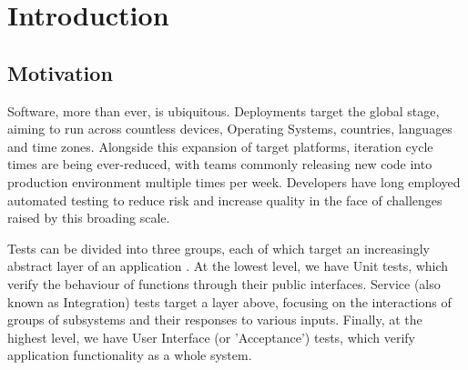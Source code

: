 \section{Introduction}
\label{sec:intro}


\subsection{Motivation}

Software, more than ever, is ubiquitous. Deployments target the global stage, aiming to run across countless devices, Operating Systems, countries, languages and time zones. Alongside this expansion of target platforms, iteration cycle times are being ever-reduced, with teams commonly releasing new code into production environment multiple times per week. Developers have long employed automated testing to reduce risk and increase quality in the face of challenges raised by this broading scale.

Tests can be divided into three groups, each of which target an increasingly abstract layer of an application \citep[see][Chapter~16]{cohn2009succeeding}. At the lowest level, we have Unit tests, which verify the behaviour of functions through their public interfaces. Service (also known as Integration) tests target a layer above, focusing on the interactions of groups of subsystems and their responses to various inputs. Finally, at the highest level, we have User Interface (or 'Acceptance') tests, which verify application functionality as a whole system.


